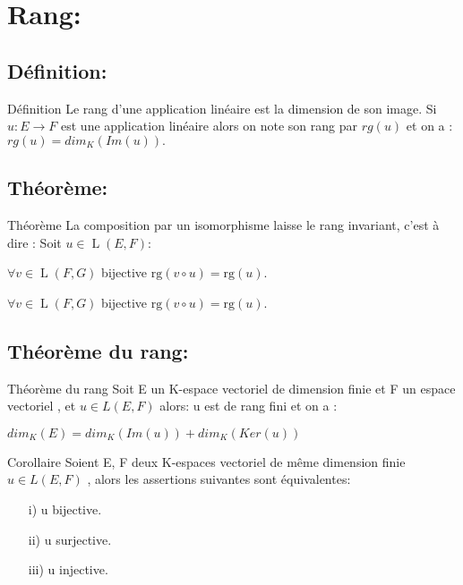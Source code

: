 \documentclass{book}
\begin{document}
\section{Rang:}
\subsection{Définition:}
\begin{Définition}[]{Définition}{}
Le rang d'une application linéaire est la dimension de son image. 
Si ${\displaystyle u:E\to F}$ est une application linéaire alors on note son rang par $rg(u)$ et on a :
    ${\displaystyle rg(u) = dim_{K}(Im(u))}.$
\end{Définition}
\subsection{Théorème:}
\begin{Théorème}[]{Théorème}{}
La composition par un isomorphisme laisse le rang invariant, c'est à dire :
Soit ${\displaystyle u\in \operatorname {L} (E,F)}$:
    
${\displaystyle \forall v\in \operatorname {L} (F,G)}$ bijective ${\displaystyle \mathrm {rg} (v\circ u)=\mathrm {rg} (u)}.$

${\displaystyle \forall v\in \operatorname {L} (F,G)}$ bijective $ {\displaystyle\mathrm {rg} (v\circ u)=\mathrm {rg} (u)}.$
\end{Théorème}
\subsection{Théorème du rang:}
\begin{Théorème}[]{Théorème du rang}{}
    Soit E un K-espace vectoriel de dimension finie et F un espace vectoriel , et ${\displaystyle u \in L(E,F)}$ alors:
    u est de rang fini et on a :
    
    ${\displaystyle dim_{K}(E)=dim_{K}(Im(u))+dim_{K}(Ker(u))}$
    
\end{Théorème}
\begin{Propriété}[]{Corollaire}{}
 Soient E, F deux K-espaces vectoriel de même dimension finie \(u \in L(E,F)\) , alors les assertions suivantes sont équivalentes:
 \\ \begin{itemize}
     \item[i)] u bijective.
     \item[ii)] u surjective.
     \item[iii)] u injective.
 \end{itemize}
\end{Propriété}
\end{document}
